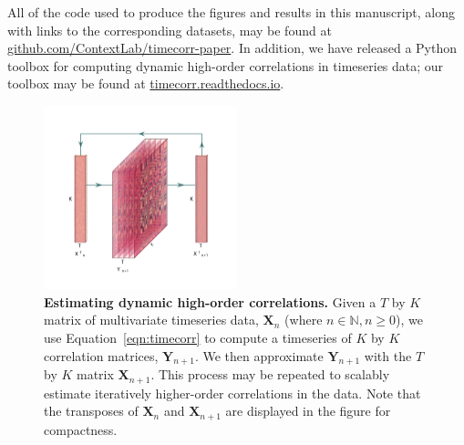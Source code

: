 \documentclass[english]{article}
\begin{document}
All of the code used to produce
the figures and results in this manuscript, along with links to the
corresponding datasets, may be found at
\href{https://github.com/ContextLab/timecorr-paper}{github.com/ContextLab/timecorr-paper}.
In addition, we have released a Python toolbox for computing dynamic
high-order correlations in timeseries data; our toolbox may be found
at
\href{https://timecorr.readthedocs.io/}{timecorr.readthedocs.io}.
\begin{figure}
  \centering
  \includegraphics[width=0.5\textwidth]{figs/methods_fig}
  \caption{\textbf{Estimating dynamic high-order correlations.}  Given
    a $T$ by $K$ matrix of multivariate timeseries data,
    $\mathbf{X}_n$ (where $n \in \mathbb{N}, n \geq 0$), we use
    Equation~\ref{eqn:timecorr} to compute a timeseries of
    $K$ by $K$ correlation matrices, $\mathbf{Y}_{n+1}$.  We then
    approximate $\mathbf{Y}_{n+1}$ with the $T$ by $K$ matrix
    $\mathbf{X}_{n+1}$.  This process may be repeated to scalably estimate
    iteratively higher-order correlations in the data.  Note that the
    transposes of $\mathbf{X}_n$ and $\mathbf{X}_{n+1}$ are displayed
    in the figure for compactness.
  \label{fig:methods}}

\end{figure}
\end{document}
